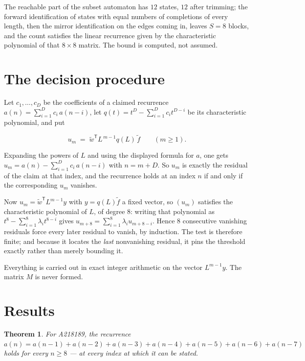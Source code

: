 \documentclass[11pt]{article}
\newtheorem{theorem}{Theorem}
\theoremstyle{definition}
\begin{document}
The reachable part of the subset automaton has $12$ states, $12$ after trimming; the forward identification of states with equal numbers of completions of every length, then the mirror identification on the edges coming in, leaves $S = 8$ blocks, and the count satisfies the linear recurrence given by the characteristic polynomial of that $8\times8$ matrix. The bound is computed, not assumed.

\section{The decision procedure}

Let $c_1,\dots,c_D$ be the coefficients of a claimed recurrence $a(n) = \sum_{i=1}^{D} c_i\,a(n-i)$, let $q(t) = t^{D} - \sum_{i=1}^{D} c_i t^{D-i}$ be its characteristic polynomial, and put

\[u_m \;=\; \tilde w^{\mathsf T} L^{\,m-1} q(L)\,\tilde f \qquad (m \ge 1).\]

Expanding the powers of $L$ and using the displayed formula for $a$, one gets $u_m = a(n) - \sum_{i=1}^{D} c_i\,a(n-i)$ with $n = m + D$. So $u_m$ is exactly the residual of the claim at that index, and the recurrence holds at an index $n$ if and only if the corresponding $u_m$ vanishes.

Now $u_m = \tilde w^{\mathsf T} L^{m-1} y$ with $y = q(L)\tilde f$ a fixed vector, so $(u_m)$ satisfies the characteristic polynomial of $L$, of degree $8$: writing that polynomial as $t^{8} - \sum_{i=1}^{8} \lambda_i t^{8-i}$ gives $u_{m+8} = \sum_{i=1}^{8} \lambda_i u_{m+8-i}$. Hence $8$ consecutive vanishing residuals force every later residual to vanish, by induction. The test is therefore finite; and because it locates the {\itshape last} nonvanishing residual, it pins the threshold exactly rather than merely bounding it.

Everything is carried out in exact integer arithmetic on the vector $L^{m-1}y$. The matrix $M$ is never formed.

\section{Results}

\begin{theorem} For A218189, the recurrence $a(n) = a(n-1) + a(n-2) + a(n-3) + a(n-4) + a(n-5) + a(n-6) + a(n-7)$ holds for every $n \ge 8$ --- at every index at which it can be stated.\end{theorem}
\end{document}
